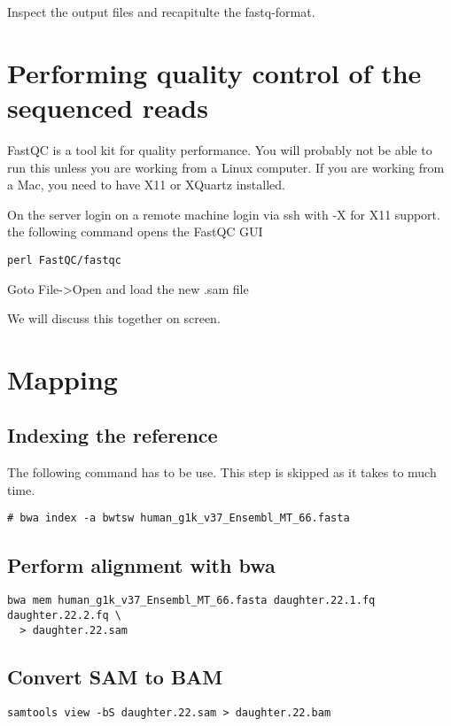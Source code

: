 \documentclass{article}
\begin{document}
Inspect the output files and recapitulte the fastq-format.

\section{Performing quality control of the sequenced reads}
FastQC is a tool kit for quality performance. You will probably not be able to run 
this unless you are working from a Linux computer. 
If you are working from a Mac, you need to have X11 or XQuartz installed.

On the server login on a remote machine login via ssh with -X for X11 support.
the following command opens the FastQC GUI
\begin{verbatim}
perl FastQC/fastqc
\end{verbatim}

Goto File->Open
and load the new .sam file

We will discuss this together on screen. 

\section{Mapping}
\subsection{Indexing the reference }
The following command has to be use. This step is skipped as it takes to much time.
\begin{verbatim}
# bwa index -a bwtsw human_g1k_v37_Ensembl_MT_66.fasta
\end{verbatim}



\subsection{Perform alignment with bwa} 

\begin{verbatim}
bwa mem human_g1k_v37_Ensembl_MT_66.fasta daughter.22.1.fq daughter.22.2.fq \
  > daughter.22.sam
\end{verbatim}


\subsection{Convert SAM to BAM}
\begin{verbatim}
samtools view -bS daughter.22.sam > daughter.22.bam
\end{verbatim}
\end{document}
